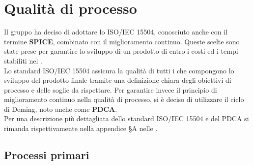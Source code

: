 \section{Qualità di processo}
\label{qualità_processo}
Il gruppo {\Gruppo} ha deciso di adottare lo  ISO/IEC 15504, conosciuto anche con il termine \textbf{SPICE}, combinato con il miglioramento continuo. Queste scelte sono state prese per garantire lo sviluppo di un prodotto di  entro i costi ed i tempi stabiliti nel \PdP{}.\\
Lo standard ISO/IEC 15504 assicura la qualità di tutti i  che compongono lo sviluppo del prodotto finale tramite una definizione chiara degli obiettivi di processo e delle soglie da rispettare. Per garantire invece il principio di miglioramento continuo nella qualità di processo, si è deciso di utilizzare il ciclo di Deming, noto anche come \textbf{PDCA}.\\
Per una descrizione più dettagliata dello standard ISO/IEC 15504 e del PDCA si rimanda rispettivamente nella appendice \S{A} nelle .
\subsection{Processi primari}
